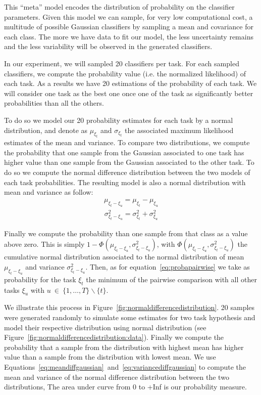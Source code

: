 This ``meta'' model encodes the distribution of probability on the classifier parameters. Given this model we can sample, for very low computational cost, a multitude of possible Gaussian classifiers by sampling a mean and covariance for each class. The more we have data to fit our model, the less uncertainty remains and the less variability will be observed in the generated classifiers.

In our experiment, we will sampled 20 classifiers per task. For each sampled classifiers, we compute the probability value (i.e. the normalized likelihood) of each task. As a results we have 20 estimations of the probability of each task. We will consider one task as the best one once one of the task as significantly better probabilities than all the others.

To do so we model our 20 probability estimates for each task by a normal distribution, and denote as $\mu_{\xi_t}$ and $\sigma_{\xi_t}$ the associated maximum likelihood estimates of the mean and variance. To compare two distributions, we compute the probability that one sample from the Gaussian associated to one task has higher value than one sample from the Gaussian associated to the other task. To do so we compute the normal difference distribution between the two models of each task probabilities. The resulting model is also a normal distribution with mean and variance as follow:
%
\begin{eqnarray}
\mu_{\xi_t - \xi_u} = \mu_{\xi_t} - \mu_{\xi_u} 
\label{eq:meandiffgaussian}
\end{eqnarray}
%
\begin{eqnarray}
\sigma^2_{\xi_t - \xi_u} = \sigma^2_{\xi_t} + \sigma^2_{\xi_u}
\label{eq:variancediffgaussian}
\end{eqnarray}

Finally we compute the probability than one sample from that class as a value above zero. This is simply $1 - \Phi(\mu_{\xi_t - \xi_u}, \sigma^2_{\xi_t - \xi_u})$, with $\Phi(\mu_{\xi_t - \xi_u}, \sigma^2_{\xi_t - \xi_u})$ the cumulative normal distribution associated to the normal distribution of mean $\mu_{\xi_t - \xi_u}$ and variance $\sigma^2_{\xi_t - \xi_u}$. Then, as for equation~\ref{eq:probapairwise} we take as probability for the task  $\xi_t$ the minimum of the pairwise comparison with all other tasks $\xi_u$ with $u~\in~\{1, \ldots, T\} \smallsetminus \{t\}$.

We illustrate this process in Figure~\ref{fig:normaldifferencedistribution}. 20 samples were generated randomly to simulate some estimates for two task hypothesis and model their respective distribution using normal distribution (see Figure~\ref{fig:normaldifferencedistribution:data}). Finally we compute the probability that a sample from the distribution with highest mean has higher value than a sample from the distribution with lowest mean. We use Equations~\ref{eq:meandiffgaussian}~and~\ref{eq:variancediffgaussian} to compute the mean and variance of the normal difference distribution between the two distributions, The area under curve from 0 to +Inf is our probability measure.


